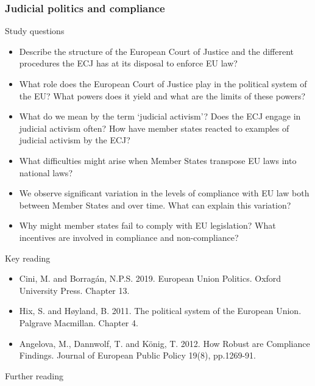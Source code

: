 \subsubsection*{Judicial politics and compliance}

Study questions

\begin{itemize}
	\item Describe the structure of the European Court of Justice and the different procedures the ECJ has at its disposal to enforce EU law?
	\item What role does the European Court of Justice play in the political system of the EU? What powers does it yield and what are the limits of these powers?
	\item What do we mean by the term `judicial activism'? Does the ECJ engage in judicial activism often? How have member states reacted to examples of judicial activism by the ECJ?
	\item What difficulties might arise when Member States transpose EU laws into national laws?
	\item We observe significant variation in the levels of compliance with EU law both between Member States and over time. What can explain this variation?
	\item Why might member states fail to comply with EU legislation? What incentives are involved in compliance and non-compliance?
\end{itemize}

\noindent Key reading
	
\begin{itemize}
	\item Cini, M. and Borragán, N.P.S. 2019. European Union Politics. Oxford University Press. Chapter 13.
	\item Hix, S. and H\o yland, B. 2011. The political system of the European Union. Palgrave Macmillan. Chapter 4.
	\item Angelova, M., Dannwolf, T. and K{\"o}nig, T. 2012. How Robust are Compliance Findings. Journal of European Public Policy 19(8), pp.1269-91.
\end{itemize}

\noindent Further reading
	

